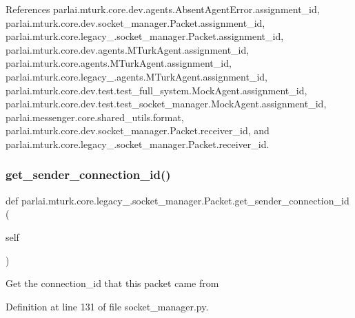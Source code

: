 References parlai.\+mturk.\+core.\+dev.\+agents.\+Absent\+Agent\+Error.\+assignment\+\_\+id, parlai.\+mturk.\+core.\+dev.\+socket\+\_\+manager.\+Packet.\+assignment\+\_\+id, parlai.\+mturk.\+core.\+legacy\+\_.\+socket\+\_\+manager.\+Packet.\+assignment\+\_\+id, parlai.\+mturk.\+core.\+dev.\+agents.\+M\+Turk\+Agent.\+assignment\+\_\+id, parlai.\+mturk.\+core.\+agents.\+M\+Turk\+Agent.\+assignment\+\_\+id, parlai.\+mturk.\+core.\+legacy\+\_.\+agents.\+M\+Turk\+Agent.\+assignment\+\_\+id, parlai.\+mturk.\+core.\+dev.\+test.\+test\+\_\+full\+\_\+system.\+Mock\+Agent.\+assignment\+\_\+id, parlai.\+mturk.\+core.\+dev.\+test.\+test\+\_\+socket\+\_\+manager.\+Mock\+Agent.\+assignment\+\_\+id, parlai.\+messenger.\+core.\+shared\+\_\+utils.\+format, parlai.\+mturk.\+core.\+dev.\+socket\+\_\+manager.\+Packet.\+receiver\+\_\+id, and parlai.\+mturk.\+core.\+legacy\+\_.\+socket\+\_\+manager.\+Packet.\+receiver\+\_\+id.

\mbox{\label{classparlai_1_1mturk_1_1core_1_1legacy__2018_1_1socket__manager_1_1Packet_a023fe8d46cb9a3625ab278d7d72d0823}} 
\subsubsection{\texorpdfstring{get\+\_\+sender\+\_\+connection\+\_\+id()}{get\_sender\_connection\_id()}}
{\footnotesize\ttfamily def parlai.\+mturk.\+core.\+legacy\+\_.\+socket\+\_\+manager.\+Packet.\+get\+\_\+sender\+\_\+connection\+\_\+id (\begin{DoxyParamCaption}\item[{}]{self }\end{DoxyParamCaption})}

\begin{DoxyVerb}Get the connection_id that this packet came from\end{DoxyVerb}
 

Definition at line 131 of file socket\+\_\+manager.\+py.



